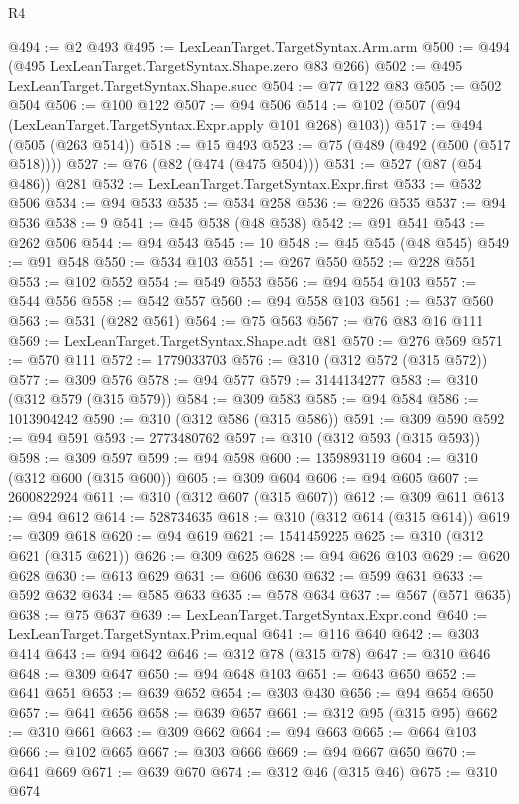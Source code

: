 \begin{lexlean}{R4}
\begin{coremodule}
@494 := @2 @493
@495 := LexLeanTarget.TargetSyntax.Arm.arm
@500 := @494 (@495 LexLeanTarget.TargetSyntax.Shape.zero @83 @266)
@502 := @495 LexLeanTarget.TargetSyntax.Shape.succ
@504 := @77 @122 @83
@505 := @502 @504
@506 := @100 @122
@507 := @94 @506
@514 := @102 (@507 (@94 (LexLeanTarget.TargetSyntax.Expr.apply @101 @268) @103))
@517 := @494 (@505 (@263 @514))
@518 := @15 @493
@523 := @75 (@489 (@492 (@500 (@517 @518))))
@527 := @76 (@82 (@474 (@475 @504)))
@531 := @527 (@87 (@54 @486)) @281
@532 := LexLeanTarget.TargetSyntax.Expr.first
@533 := @532 @506
@534 := @94 @533
@535 := @534 @258
@536 := @226 @535
@537 := @94 @536
@538 := 9
@541 := @45 @538 (@48 @538)
@542 := @91 @541
@543 := @262 @506
@544 := @94 @543
@545 := 10
@548 := @45 @545 (@48 @545)
@549 := @91 @548
@550 := @534 @103
@551 := @267 @550
@552 := @228 @551
@553 := @102 @552
@554 := @549 @553
@556 := @94 @554 @103
@557 := @544 @556
@558 := @542 @557
@560 := @94 @558 @103
@561 := @537 @560
@563 := @531 (@282 @561)
@564 := @75 @563
@567 := @76 @83 @16 @111
@569 := LexLeanTarget.TargetSyntax.Shape.adt @81
@570 := @276 @569
@571 := @570 @111
@572 := 1779033703
@576 := @310 (@312 @572 (@315 @572))
@577 := @309 @576
@578 := @94 @577
@579 := 3144134277
@583 := @310 (@312 @579 (@315 @579))
@584 := @309 @583
@585 := @94 @584
@586 := 1013904242
@590 := @310 (@312 @586 (@315 @586))
@591 := @309 @590
@592 := @94 @591
@593 := 2773480762
@597 := @310 (@312 @593 (@315 @593))
@598 := @309 @597
@599 := @94 @598
@600 := 1359893119
@604 := @310 (@312 @600 (@315 @600))
@605 := @309 @604
@606 := @94 @605
@607 := 2600822924
@611 := @310 (@312 @607 (@315 @607))
@612 := @309 @611
@613 := @94 @612
@614 := 528734635
@618 := @310 (@312 @614 (@315 @614))
@619 := @309 @618
@620 := @94 @619
@621 := 1541459225
@625 := @310 (@312 @621 (@315 @621))
@626 := @309 @625
@628 := @94 @626 @103
@629 := @620 @628
@630 := @613 @629
@631 := @606 @630
@632 := @599 @631
@633 := @592 @632
@634 := @585 @633
@635 := @578 @634
@637 := @567 (@571 @635)
@638 := @75 @637
@639 := LexLeanTarget.TargetSyntax.Expr.cond
@640 := LexLeanTarget.TargetSyntax.Prim.equal
@641 := @116 @640
@642 := @303 @414
@643 := @94 @642
@646 := @312 @78 (@315 @78)
@647 := @310 @646
@648 := @309 @647
@650 := @94 @648 @103
@651 := @643 @650
@652 := @641 @651
@653 := @639 @652
@654 := @303 @430
@656 := @94 @654 @650
@657 := @641 @656
@658 := @639 @657
@661 := @312 @95 (@315 @95)
@662 := @310 @661
@663 := @309 @662
@664 := @94 @663
@665 := @664 @103
@666 := @102 @665
@667 := @303 @666
@669 := @94 @667 @650
@670 := @641 @669
@671 := @639 @670
@674 := @312 @46 (@315 @46)
@675 := @310 @674

\end{coremodule}
\end{lexlean}
